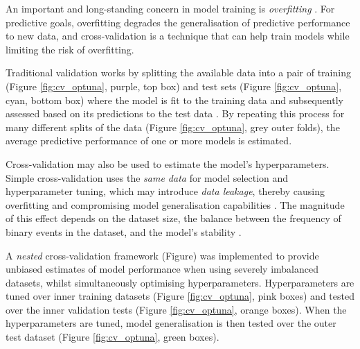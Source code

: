 An important and long-standing concern in model training is \textit{overfitting} \citep{Ying_2019}. For predictive goals, overfitting degrades the generalisation of predictive performance to new data, and cross-validation is a technique that can help train models while limiting the risk of overfitting.

Traditional validation works by splitting the available data into a pair of training (Figure \ref{fig:cv_optuna}, purple, top box) and test sets (Figure \ref{fig:cv_optuna}, cyan, bottom box) where the model is fit to the training data and subsequently assessed based on its predictions to the test data \citep{Hastie_2009}. By repeating this process for many different splits of the data (Figure \ref{fig:cv_optuna}, grey outer folds), the average predictive performance of one or more models is estimated.

Cross-validation may also be used to estimate the model's hyperparameters. Simple cross-validation uses the \textit{same data} for model selection and hyperparameter tuning, which may introduce \textit{data leakage}, thereby causing overfitting and compromising model generalisation capabilities \citep{Sasse_2025}. The magnitude of this effect depends on the dataset size, the balance between the frequency of binary events in the dataset, and the model's stability \citep{Sasse_2025}.

A \textit{nested} cross-validation framework (Figure) was implemented to provide unbiased estimates of model performance when using severely imbalanced datasets, whilst simultaneously optimising hyperparameters. Hyperparameters are tuned over inner training datasets (Figure \ref{fig:cv_optuna}, pink boxes) and tested over the inner validation tests (Figure \ref{fig:cv_optuna}, orange boxes). When the hyperparameters are tuned, model generalisation is then tested over the outer test dataset (Figure \ref{fig:cv_optuna}, green boxes).



